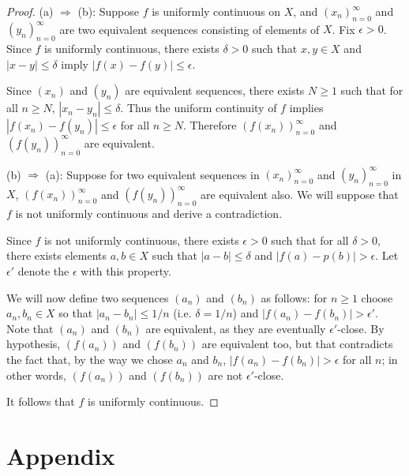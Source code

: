 \documentclass{article}
\begin{document}
\begin{proof}
(a) $\Rightarrow$ (b): Suppose $f$ is uniformly continuous on $X$, and $(x_n)_{n=0}^\infty$ and $(y_n)_{n=0}^\infty$ are two equivalent sequences consisting of elements of $X$. Fix $\epsilon > 0$. Since $f$ is uniformly continuous, there exists $\delta > 0$ such that $x,y \in X$ and $|x - y| \leq \delta$ imply $|f(x) - f(y)| \leq \epsilon$.


Since $(x_n)$ and $(y_n)$ are equivalent sequences, there exists $N \geq 1$ such that for all $n \geq N$, $|x_n - y_n| \leq \delta$. Thus the uniform continuity of $f$ implies $|f(x_n) - f(y_n)| \leq \epsilon$ for all $n \geq N$. Therefore $(f(x_n))_{n=0}^\infty$ and $(f(y_n))_{n=0}^\infty$ are equivalent.

(b) $\Rightarrow$ (a): Suppose for two equivalent sequences in $(x_n)_{n=0}^\infty$ and $(y_n)_{n=0}^\infty$ in $X$, $(f(x_n))_{n=0}^\infty$ and $(f(y_n))_{n=0}^\infty$ are equivalent also. We will suppose that $f$ is not uniformly continuous and derive a contradiction.

Since $f$ is not uniformly continuous, there exists $\epsilon > 0$ such that for all $\delta > 0$, there exists elements $a,b \in X$ such that $|a - b| \leq \delta$ and $|f(a) - p(b)| > \epsilon$. Let $\epsilon'$ denote the $\epsilon$ with this property. 

We will now define two sequences $(a_n)$ and $(b_n)$ as follows: for $n \geq 1$ choose $a_n, b_n \in X$ so that $|a_n - b_n| \leq 1/n$ (i.e. $\delta = 1/n$) and $|f(a_n) - f(b_n)| > \epsilon'$. Note that $(a_n)$ and $(b_n)$ are equivalent, as they are eventually $\epsilon'$-close. By hypothesis, $(f(a_n))$ and $(f(b_n))$ are equivalent too, but that contradicts the fact that, by the way we chose $a_n$ and $b_n$, $|f(a_n) - f(b_n)| > \epsilon$ for all $n$; in other words, $(f(a_n))$ and $(f(b_n))$ are not $\epsilon'$-close.

It follows that $f$ is uniformly continuous.
\end{proof}

\pagebreak
\section*{Appendix}
\end{document}
